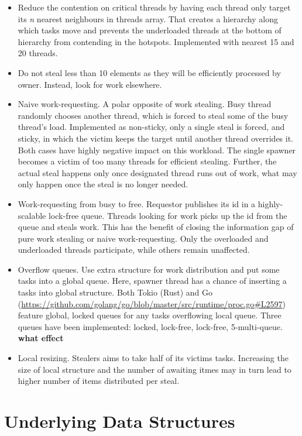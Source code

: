 \documentclass[12pt,a4paper,twoside]{report}
\begin{document}
\begin{itemize}
    \item Reduce the contention on critical threads by having each thread only target its \textit{n} nearest neighbours in threads array. That creates a hierarchy along which tasks move and prevents the underloaded threads at the bottom of hierarchy from contending in the hotspots. Implemented with nearest 15 and 20 threads.
    \item Do not steal less than 10 elements as they will be efficiently processed by owner. Instead, look for work elsewhere. 
    \item Naive work-requesting. A polar opposite of work stealing. Busy thread randomly chooses another thread, which is forced to steal some of the busy thread's load. Implemented as non-sticky, only a single steal is forced, and sticky, in which the victim keeps the target until another thread overrides it. Both cases have highly negative impact on this workload. The single spawner becomes a victim of too many threads for efficient stealing. Further, the actual steal happens only once designated thread runs out of work, what may only happen once the steal is no longer needed.
    \item Work-requesting from busy to free. Requestor publishes its id in a highly-scalable lock-free queue. Threads looking for work picks up the id from the queue and steals work. This has the benefit of closing the information gap of pure work stealing or naive work-requesting. Only the overloaded and underloaded threads participate, while others remain unaffected.
    \item Overflow queues. Use extra structure for work distribution and put some tasks into a global queue. Here, spawner thread has a chance of inserting a tasks into global structure. Both Tokio (Rust) and Go (\url{https://github.com/golang/go/blob/master/src/runtime/proc.go#L2597}) feature global, locked queues for any tasks overflowing local queue. Three queues have been implemented: locked, lock-free, lock-free, 5-multi-queue. \textbf{what effect}
    \item Local resizing. Stealers aims to take half of its victims tasks. Increasing the size of local structure and the number of awaiting itmes may in turn lead to higher number of items distributed per steal. 
\end{itemize}


\section{Underlying Data Structures}
\end{document}
